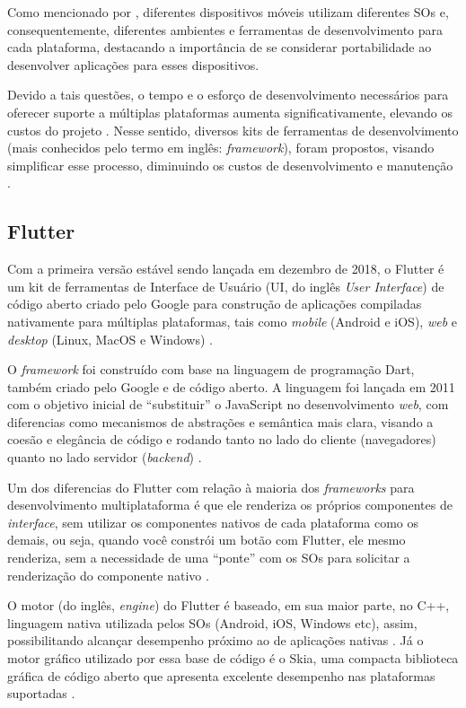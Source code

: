 Como mencionado por , diferentes dispositivos móveis utilizam diferentes SOs e, consequentemente, diferentes
ambientes e ferramentas de desenvolvimento para cada plataforma, destacando a importância de se considerar portabilidade ao desenvolver aplicações
para esses dispositivos.

Devido a tais questões, o tempo e o esforço de desenvolvimento necessários para oferecer suporte a múltiplas plataformas aumenta
significativamente, elevando os custos do projeto \cite{Henning2013,Wasserman2010}. Nesse sentido, diversos kits de ferramentas de
desenvolvimento (mais conhecidos pelo termo em inglês: \emph{framework}), foram propostos, visando simplificar esse processo, diminuindo os
custos de desenvolvimento e manutenção \cite{Martinez2017,Francese2015}.

\subsection{Flutter}

Com a primeira versão estável sendo lançada em dezembro de 2018, o Flutter é um kit de ferramentas de Interface
de Usuário (UI, do inglês \emph{User Interface}) de código aberto criado pelo Google para construção de aplicações compiladas nativamente
para múltiplas plataformas, tais como \emph{mobile} (Android e iOS), \emph{web} e \emph{desktop} (Linux, MacOS e Windows) \cite{kuzmin2020experience}.

O \emph{framework} foi construído com base na linguagem de programação Dart, também criado pelo Google e de código aberto.
A linguagem foi lançada em 2011 com o objetivo inicial de ``substituir'' o JavaScript no desenvolvimento \emph{web},
com diferencias como mecanismos de abstrações e semântica mais clara, visando a coesão e elegância de código e
rodando tanto no lado do cliente (navegadores) quanto no lado servidor
(\emph{backend}) \cite{walrath2012dart}.

Um dos diferencias do Flutter com relação à maioria dos \emph{frameworks} para desenvolvimento multiplataforma é que ele renderiza os próprios
componentes de \emph{interface}, sem utilizar os componentes nativos de cada plataforma como os demais, ou seja, quando você constrói um botão com Flutter,
ele mesmo renderiza, sem a necessidade de uma ``ponte'' com os SOs para solicitar a renderização do componente nativo \cite{zammetti2019practical,boukhary2019clean}.

O motor (do inglês, \emph{engine}) do Flutter é baseado, em sua maior parte, no C++, linguagem nativa utilizada pelos SOs (Android, iOS, Windows etc), assim,
possibilitando alcançar desempenho próximo ao de aplicações nativas \cite{zammetti2019practical,kuzmin2020experience}. Já o motor gráfico utilizado por essa
base de código é o Skia, uma compacta biblioteca gráfica de código aberto que apresenta excelente desempenho nas plataformas
suportadas \cite{zammetti2019practical,boukhary2019clean}.


